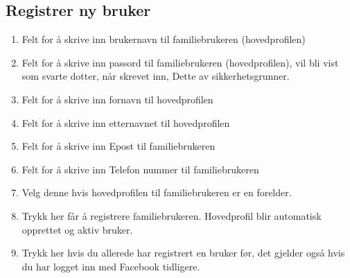 \subsection{Registrer ny bruker}
\begin{center}
\end{center}
\begin{enumerate}[nosep]
    \item Felt for å skrive inn brukernavn til familiebrukeren (hovedprofilen)
    \item Felt for å skrive inn passord til familiebrukeren (hovedprofilen),  vil bli vist som svarte dotter, når skrevet inn, Dette av sikkerhetsgrunner.
    \item Felt for å skrive inn fornavn til hovedprofilen
    \item Felt for å skrive inn etternavnet til hovedprofilen
    \item Felt for å skrive inn Epost til familiebrukeren
    \item Felt for å skrive inn Telefon nummer til familiebrukeren
    \item Velg denne hvis hovedprofilen til familiebrukeren er en forelder.
    \item Trykk her får å registrere familiebrukeren. Hovedprofil blir automatisk opprettet og aktiv bruker.
    \item Trykk her hvis du allerede har registrert en bruker før, det gjelder også hvis du har logget inn med Facebook tidligere.
\end{enumerate}

